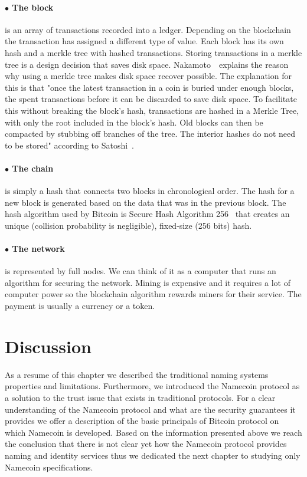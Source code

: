 \paragraph{$\bullet$ The block}is an array of transactions recorded into a ledger. Depending on the blockchain the transaction has assigned a different type of value.
Each block has its own hash and a merkle tree with hashed transactions. Storing transactions in a merkle tree is a design decision that saves disk space. Nakamoto~\cite{bitcoinwhitepaper}\ explains the reason why using a merkle tree makes disk space recover possible. The explanation for this is that "once the latest transaction in a coin is buried under enough blocks, the spent transactions before it can be discarded to save disk space. To facilitate this without breaking the block’s hash, transactions are hashed in a Merkle Tree, with only the root included in the block’s hash. Old blocks can then be compacted by stubbing off branches of the tree. The interior hashes do not need to be stored" according to Satoshi~\cite{bitcoinwhitepaper}.
\paragraph{$\bullet$ The chain}is simply a hash that connects two blocks in chronological order. The hash for a new block is generated based on the data that was in the previous block. The hash algorithm used by Bitcoin is Secure Hash Algorithm 256~\cite{sha2} that creates an unique (collision probability is negligible), fixed-size (256 bits) hash. 
\paragraph{$\bullet$ The network}is represented by full nodes. We can think of it as a computer that runs an algorithm for securing the network.
Mining is expensive and it requires a lot of computer power so the blockchain algorithm rewards miners for their service. The payment is usually a currency or a token.


\section{Discussion}
\label{sec:discussion-lbl}
As a resume of this chapter we described the traditional naming systems properties and limitations. Furthermore, we introduced the Namecoin protocol as a solution to the trust issue that exists in traditional protocols. For a clear understanding of the Namecoin protocol and what are the security guarantees it provides we offer a description of the basic principals of Bitcoin protocol on which Namecoin is developed.
Based on the information presented above we reach the conclusion that there is not clear yet how the Namecoin protocol provides naming and identity services thus we dedicated the next chapter to studying only Namecoin specifications.
